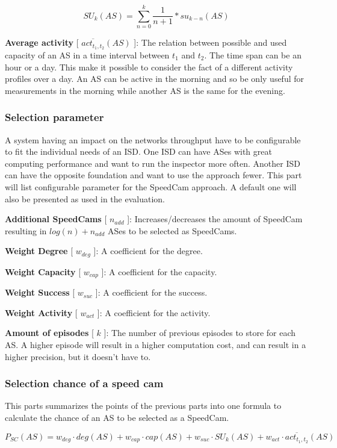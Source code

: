 \documentclass[thesis.tex]{subfiles}
\begin{document}
$$SU_{k}(AS) = \sum_{n=0}^{k} \frac{1}{n+1}*su_{k-n}(AS)$$

\textbf{Average activity} [ $\overline{act_{t_1,t_2}}(AS)$ ]: The relation between possible and used capacity of an AS in a time interval between $t_1$ and $t_2$. The time span can be an hour or a day. This make it possible to consider the fact of a different activity profiles over a day. An AS can be active in the morning and so be only useful for measurements in the morning while another AS is the same for the evening. 

\newpage
\subsubsection{Selection parameter}

A system having an impact on the networks throughput have to be configurable to fit the individual needs of an ISD. One ISD can have ASes with great computing performance and want to run the inspector more often. Another ISD can have the opposite foundation and want to use the approach fewer. This part will list configurable parameter for the SpeedCam approach. A default one will also be presented as used in the evaluation.

\textbf{Additional SpeedCams} [ $n_{add}$ ]: Increases/decreases the amount of SpeedCam resulting in $log(n) + n_{add}$ ASes to be selected as SpeedCams.

\textbf{Weight Degree} [ $w_{deg}$ ]: A coefficient for the degree. 

\textbf{Weight Capacity} [ $w_{cap}$ ]: A coefficient for the capacity. 

\textbf{Weight Success} [ $w_{suc}$ ]: A coefficient for the success. 

\textbf{Weight Activity} [ $w_{act}$ ]: A coefficient for the activity. 

\textbf{Amount of episodes} [ $k$ ]: The number of previous episodes to store for each AS. A higher episode will result in a higher computation cost, and can result in a higher precision, but it doesn't have to.

\subsubsection{Selection chance of a speed cam}
This parts summarizes the points of the previous parts into one formula to calculate the chance of an AS to be selected as a SpeedCam.

$$P_{SC}(AS) = w_{deg}\cdot deg(AS) + w_{cap}\cdot cap(AS) + w_{suc}\cdot SU_k(AS) + w_{act}\cdot \overline{act_{t_1,t_2}}(AS)$$
\end{document}

